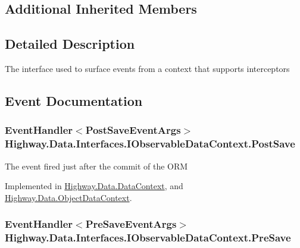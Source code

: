 \subsection*{Additional Inherited Members}


\subsection{Detailed Description}
The interface used to surface events from a context that supports interceptors 



\subsection{Event Documentation}
\hypertarget{interface_highway_1_1_data_1_1_interfaces_1_1_i_observable_data_context_a1978b914f7b94a37a6e86f3314326ca9}{
\subsubsection[{Post\-Save}]{\setlength{\rightskip}{0pt plus 5cm}Event\-Handler$<${\bf Post\-Save\-Event\-Args}$>$ Highway.\-Data.\-Interfaces.\-I\-Observable\-Data\-Context.\-Post\-Save}}\label{interface_highway_1_1_data_1_1_interfaces_1_1_i_observable_data_context_a1978b914f7b94a37a6e86f3314326ca9}


The event fired just after the commit of the O\-R\-M 



Implemented in \hyperlink{class_highway_1_1_data_1_1_data_context_a5363d61dfcaa37657d39a7439b4d6281}{Highway.\-Data.\-Data\-Context}, and \hyperlink{class_highway_1_1_data_1_1_object_data_context_ab361ad5a8c621b099944e255b8593046}{Highway.\-Data.\-Object\-Data\-Context}.

\hypertarget{interface_highway_1_1_data_1_1_interfaces_1_1_i_observable_data_context_add85ecbc05ebf7174003841bdbd72dfe}{
\subsubsection[{Pre\-Save}]{\setlength{\rightskip}{0pt plus 5cm}Event\-Handler$<${\bf Pre\-Save\-Event\-Args}$>$ Highway.\-Data.\-Interfaces.\-I\-Observable\-Data\-Context.\-Pre\-Save}}\label{interface_highway_1_1_data_1_1_interfaces_1_1_i_observable_data_context_add85ecbc05ebf7174003841bdbd72dfe}


